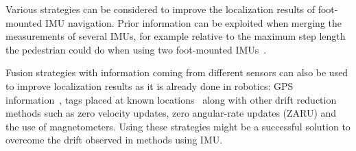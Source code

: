 Various strategies can be considered to improve the localization results of foot-mounted IMU navigation.
Prior information can be exploited when merging the measurements of several IMUs, for example relative to the maximum step length the pedestrian could do when using two foot-mounted IMUs~\cite{skog2012fusing}.

Fusion strategies with information coming from different sensors can also be used to improve localization results as it is already done
 in robotics: GPS information~\cite{hide2012investigating},%
  tags placed at known locations~\cite{ruiz2012accurate} along with other drift reduction methods such as zero velocity updates, zero angular-rate updates (ZARU) and the use of magnetometers.
Using these strategies might be a successful solution to overcome the drift observed in methods using IMU.%

